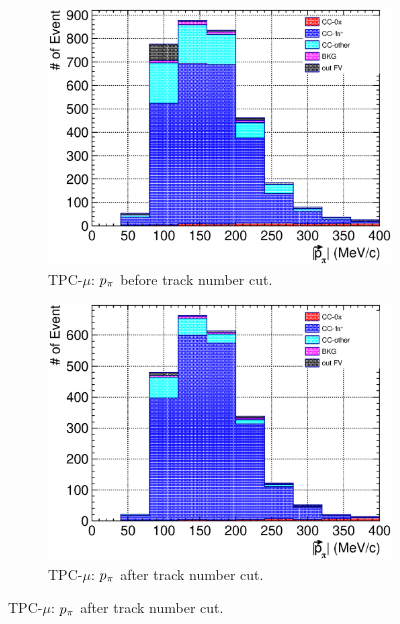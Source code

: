          \begin{figure}
             \centering
             \begin{subfigure}[!htb]{\dbfigwid\textwidth}
                  \includegraphics[width=\textwidth]{figures/sel/TPCmu_p_pi_stack_al8.eps}
                  \caption{TPC-$\mu$: $p_{\pi}$ before track number cut.}
                  \label{subfig:tlpi-ppi-bf-trknumcut-tpc}
             \end{subfigure}
             \begin{subfigure}[!htb]{\dbfigwid\textwidth}
                  \includegraphics[width=\textwidth]{figures/sel/TPCmu_p_pi_stack_al9.eps}
                  \caption{TPC-$\mu$: $p_{\pi}$ after track number cut.}
                  \label{subfig:tlpi-ppi-af-trknumcut-tpc}

\end{subfigure}
\end{figure}
